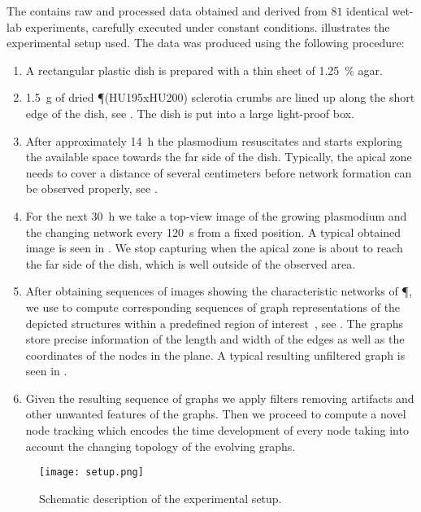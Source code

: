 	The \data contains raw and processed data obtained and derived from $81$ identical wet-lab experiments, carefully executed under constant conditions.  illustrates the experimental setup used. The data was produced using the following procedure:

	\begin{enumerate}
		\item A rectangular plastic dish is prepared with a thin sheet of \SI{1.25}{\percent} agar.
		\item \SI{1.5}{\gram} of dried \P (HU195xHU200) sclerotia crumbs are lined up along the short edge of the dish, see . The dish is put into a large light-proof box.
		\item After approximately \SI{14}{\hour} the plasmodium resuscitates and starts exploring the available space towards the far side of the dish. Typically, the apical zone needs to cover a distance of several centimeters before network formation can be observed properly, see .
		\item For the next \SI{30}{\hour} we take a top-view image of the growing plasmodium and the changing network every \SI{120}{\second} from a fixed position. A typical obtained image is seen in . We stop capturing when the apical zone is about to reach the far side of the dish, which is well outside of the observed area. 
		\item After obtaining sequences of images showing the characteristic networks of \P, we use \NEFI to compute corresponding sequences of graph representations of the depicted structures within a predefined region of interest~\cite{dirnberger2015nefi}, see . The graphs store precise information of the length and width of the edges as well as the coordinates of the nodes in the plane. A typical resulting unfiltered graph is seen in .
		\item Given the resulting sequence of graphs we apply filters removing artifacts and other unwanted features of the graphs. Then we proceed to compute a novel node tracking which encodes the time development of every node taking into account the changing topology of the evolving graphs.
	\end{enumerate}

	\begin{figure}
		\centering
		\texttt{[image: setup.png]}
		\caption[Setup for wetlab experiments.]{Schematic description of the experimental setup.}
		\label{fig:setup}
	\end{figure}

